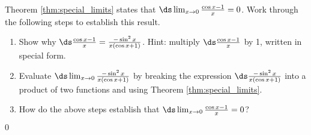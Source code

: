 {Theorem \ref{thm:special_limits} states that $\ds \lim_{x\to0} \frac{\cos x-1}{x}=0$. Work through the following steps to establish this result.
\begin{enumerate}
\item	Show why $\ds \frac{\cos x-1}{x} = \frac{-\sin^2 x}{x(\cos x+1)}$. Hint: multiply $\ds \frac{\cos x-1}{x}$ by 1, written in special form.
\item	Evaluate $\ds \lim_{x\to 0} \frac{-\sin^2 x}{x(\cos x+1)}$ by breaking the expression $\ds \frac{-\sin^2 x}{x(\cos x+1)}$ into a product of two functions and using Theorem \ref{thm:special_limits}.
\item		How do the above steps establish that $\ds \lim_{x\to0} \frac{\cos x-1}{x}=0$?
\end{enumerate}}
{$0$}

